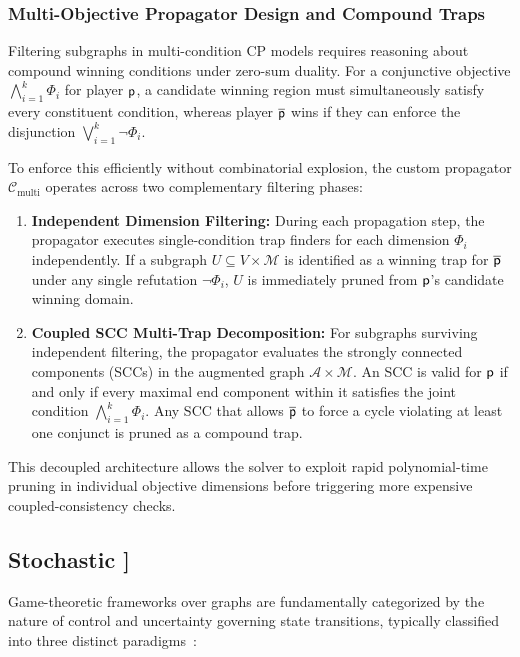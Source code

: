 \documentclass{article}
\begin{document}
\subsubsection{Multi-Objective Propagator Design and Compound Traps}
Filtering subgraphs in multi-condition CP models requires reasoning about compound winning conditions under zero-sum duality. For a conjunctive objective $\bigwedge_{i=1}^k \Phi_i$ for player $\mathsf{p}$, a candidate winning region must simultaneously satisfy every constituent condition, whereas player $\overline{\mathsf{p}}$ wins if they can enforce the disjunction $\bigvee_{i=1}^k \neg \Phi_i$.

To enforce this efficiently without combinatorial explosion, the custom propagator $\mathcal{C}_{\text{multi}}$ operates across two complementary filtering phases:
\begin{enumerate}
    \item \textbf{Independent Dimension Filtering:} During each propagation step, the propagator executes single-condition trap finders for each dimension $\Phi_i$ independently. If a subgraph $U \subseteq V \times \mathcal{M}$ is identified as a winning trap for $\overline{\mathsf{p}}$ under any single refutation $\neg \Phi_i$, $U$ is immediately pruned from $\mathsf{p}$'s candidate winning domain.
    \item \textbf{Coupled SCC Multi-Trap Decomposition:} For subgraphs surviving independent filtering, the propagator evaluates the strongly connected components (SCCs) in the augmented graph $\mathcal{A} \times \mathcal{M}$. An SCC is valid for $\mathsf{p}$ if and only if every maximal end component within it satisfies the joint condition $\bigwedge_{i=1}^k \Phi_i$. Any SCC that allows $\overline{\mathsf{p}}$ to force a cycle violating at least one conjunct is pruned as a compound trap.
\end{enumerate}
This decoupled architecture allows the solver to exploit rapid polynomial-time pruning in individual objective dimensions before triggering more expensive coupled-consistency checks.


\subsection{Stochastic \wregulargames [\hyperref[sec:rq]{RQ4}]}

Game-theoretic frameworks over graphs are fundamentally categorized by the nature of control and uncertainty governing state transitions, typically classified into three distinct paradigms~\cite{Chatterjee:2012Survey}:
\end{document}
